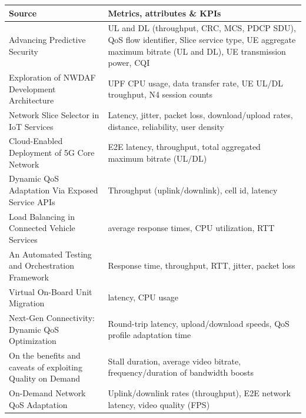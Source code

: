 \begin{table}[ht]
\centering
\tiny
\renewcommand{\arraystretch}{1.3} %
\begin{tabular}{p{4cm} p{11cm}}
\toprule
\textbf{Source} & \textbf{Metrics, attributes \& \acsp{KPI}} \\
\midrule
Advancing Predictive Security~\cite{AdvancingPredictiveSecurity} & \acf{UL} and \acf{DL} (throughput, \acs{CRC}, \acs{MCS}, \acs{PDCP} \acs{SDU}), \acs{QoS} flow identifier, Slice service type, \acs{UE} aggregate maximum bitrate (\acs{UL} and \acs{DL}), \acs{UE} transmission power, \acs{CQI} \\
Exploration of \acs{NWDAF} Development Architecture~\cite{ExplorationNWDAFDevelopmentArchitecture6G} & \acs{UPF} \acs{CPU} usage, data transfer rate, \acs{UE} \acs{UL}/\acs{DL} troughput, N4 session counts \\
Network Slice Selector in \acs{IoT} Services~\cite{NetworkSliceSelectorIoT} & Latency, jitter, packet loss, download/upload rates, distance, reliability, user density \\
Cloud-Enabled Deployment of \acs{5G} Core Network~\cite{CloudEnabledDeployment5GN} & \acs{E2E} latency, throughput, total aggregated maximum bitrate (\acs{UL}/\acs{DL}) \\
Dynamic QoS Adaptation Via Exposed Service \acsp{API}~\cite{DynamicQoSAdaptationviaExposedServiceAPIs} & Throughput (uplink/downlink), cell id, latency \\
Load Balancing in Connected Vehicle Services~\cite{LoadBalancingConnectedVehicleServices} & average response times, \acs{CPU} utilization, \acs{RTT} \\
An Automated Testing and Orchestration Framework~\cite{AutomatedTestingOrchestrationFramework} & Response time, throughput, \acs{RTT}, jitter, packet loss \\
Virtual On-Board Unit Migration~\cite{VirtualOnBoardUnitMigration} & latency, \acs{CPU} usage \\
Next-Gen Connectivity: Dynamic QoS Optimization~\cite{NextGenConnectivityDynamicQoS} & Round-trip latency, upload/download speeds, \acs{QoS} profile adaptation time \\
On the benefits and caveats of exploiting Quality on Demand~\cite{BenefitsCaveatsQoDNetworkAPIsVideoStreaming} & Stall duration, average video bitrate, frequency/duration of bandwidth boosts \\
On-Demand Network QoS Adaptation~\cite{OnDemandNetworkQoSAdaptation} & Uplink/downlink rates (throughput), \acs{E2E} network latency, video quality (\acs{FPS}) \\

\end{tabular}
\end{table}
